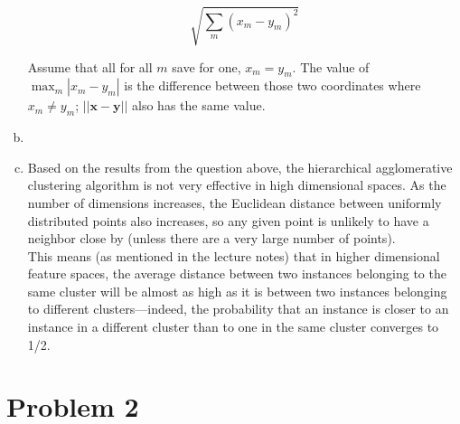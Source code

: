 \documentclass{article}
\begin{document}
\begin{enumerate}[a.]
$$\sqrt{\sum_m (x_m - y_m)^2}$$

Assume that all for all $m$ save for one, $x_m = y_m$. The value of $\max_m |x_m - y_m|$ is the difference between those two coordinates where $x_m \neq y_m$; $||\bm{x} - \bm{y}||$ also has the same value.


\item %


\item %

Based on the results from the question above, the hierarchical agglomerative clustering algorithm is not very effective in high dimensional spaces. As the number of dimensions increases, the Euclidean distance between uniformly distributed points also increases, so any given point is unlikely to have a neighbor close by (unless there are a very large number of points). \\

This means (as mentioned in the lecture notes) that in higher dimensional feature spaces, the average distance between two instances belonging to the same cluster will be almost as high as it is between two instances belonging to different clusters---indeed, the probability that an instance is closer to an instance in a different cluster than to one in the same cluster converges to 1/2.

\end{enumerate}

\section*{Problem 2}
\end{document}
